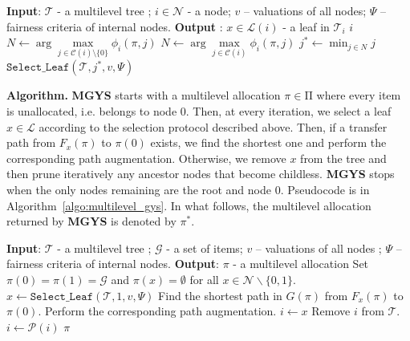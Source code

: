 \documentclass[]{article}
\newcommand{\tree}{\mathcal{T}}
\newcommand{\nodes}{\mathcal{N}}
\newcommand{\items}{\mathcal{G}}
\newcommand{\children}{\mathcal{C}}
\newcommand{\parent}{\mathcal{P}}
\newcommand{\leaves}{\mathcal{L}}
\newcommand{\mallocations}{\mathrm{\Pi}}
\begin{document}
\begin{algorithm}[] \small
\caption{\small Select\_Leaf}
\label{algo:find_leaf}
\begin{algorithmic}[1]
    \State \textbf{Input}: $\tree$ - a multilevel tree ; $i \in \nodes$ - a node; $v$ -- valuations of all nodes; $\Psi$ -- fairness criteria of internal nodes.
    \State \textbf{Output} : $x \in \leaves(i)$ - a leaf in $\tree_i$
    \If{$\children(i) = \emptyset$} 
     \State \Return $i$ 
    \EndIf
    \State $N \gets \arg \underset{j \in \children(i) \setminus \{0\}}{\max} \phi_i(\pi, j)$
    \Else 
    \State $N \gets \arg \underset{j \in \children(i)}{\max} \phi_i(\pi, j)$ \EndIf
    \State $j^* \gets \min_{j \in N} j$
    \State \Return $\mathtt{Select\_Leaf}(\tree, j^*,v,\Psi)$
\end{algorithmic}
\end{algorithm}


\noindent \textbf{Algorithm.} {\bf MGYS} starts with a multilevel allocation $\pi \in \mallocations$ where every item is unallocated, i.e. belongs to node 0. Then, at every iteration, we select a leaf $x \in \leaves$ according to the selection protocol described above. Then, if a transfer path from $F_x(\pi)$ to $\pi(0)$ exists, we find the shortest one and perform the corresponding path augmentation. Otherwise, we remove $x$ from the tree and then prune iteratively any ancestor nodes that become childless. {\bf MGYS} stops when the only nodes remaining are the root and node $0$. Pseudocode is in Algorithm~\ref{algo:multilevel_gys}. In what follows, the multilevel allocation returned by {\bf MGYS} is denoted by $\pi^*$.

\begin{algorithm}[] \small
\caption{\small Multilevel General Yankee Swap (MGYS)}
\label{algo:multilevel_gys}
\begin{algorithmic}[1]
    \State \textbf{Input}: $\tree$ - a multilevel tree ; $\items$ - a set of items; $v$ -- valuations of all nodes ; $\Psi$ -- fairness criteria of internal nodes.
    \State \textbf{Output}: $\pi $ - a multilevel allocation
    \State Set  $\pi(0)= \pi(1)= \items$ and $\pi(x) =  \emptyset$ for all $x \in \nodes \backslash \{0,1\}$.
    \While{$\nodes \neq \{1,0\}$}
    \State $x \gets \mathtt{Select\_Leaf}(\tree, 1,v, \Psi)$
    \State Find the shortest path in $G(\pi)$ from $F_{x}(\pi)$ to $\pi(0).$
        \State Perform the corresponding path augmentation.
    \Else
        \State $i \leftarrow x$
        \While{$\children(i) = \emptyset$}
        \State Remove $i$ from $\tree$.
        \State $i\leftarrow \parent(i)$
        \EndWhile
    \EndIf
    \EndWhile
    \State \Return $\pi$
\end{algorithmic}
\end{algorithm}
\end{document}
